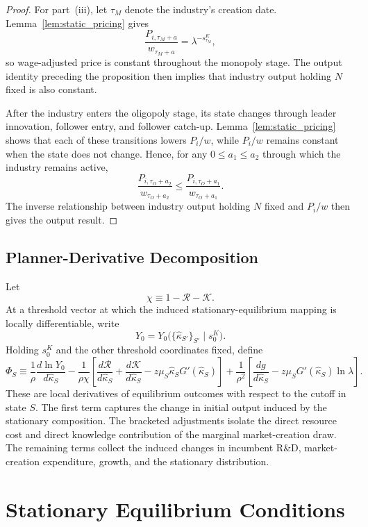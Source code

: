 \documentclass[12pt]{article}
\begin{document}
\begin{proof}
For part~(iii), let \(\tau_M\) denote the industry's creation date.
Lemma~\ref{lem:static_pricing} gives
\[
\frac{P_{i,\tau_M+a}}{w_{\tau_M+a}}
=
\lambda^{-s^K_{\tau_M}},
\]
so wage-adjusted price is constant throughout the monopoly stage. The output
identity preceding the proposition then implies that industry output holding
\(N\) fixed is also constant.

After the industry enters the oligopoly stage, its state changes through
leader innovation, follower entry, and follower catch-up.
Lemma~\ref{lem:static_pricing} shows that each of these transitions lowers
\(P_i/w\), while \(P_i/w\) remains constant when the state does not change.
Hence, for any \(0\leq a_1\leq a_2\) through which the industry remains active,
\[
\frac{P_{i,\tau_O+a_2}}{w_{\tau_O+a_2}}
\leq
\frac{P_{i,\tau_O+a_1}}{w_{\tau_O+a_1}}.
\]
The inverse relationship between industry output holding \(N\) fixed and
\(P_i/w\) then gives the output result.
\end{proof}

\subsection{Planner-Derivative Decomposition}\label{app:planner_derivative}

Let
\[
\chi\equiv1-\mathcal{R}-\mathcal{K}.
\]
At a threshold vector at which the induced stationary-equilibrium mapping is locally differentiable, write
\[
Y_0
=
Y_0\bigl(\{\hat\kappa_{S'}\}_{S'}\mid s^K_0\bigr).
\]
Holding \(s^K_0\) and the other threshold coordinates fixed, define
\[
\Phi_S\equiv\frac{1}{\rho}\frac{d\ln Y_0}{d\hat\kappa_S}
-\frac{1}{\rho\chi}\left[\frac{d\mathcal{R}}{d\hat\kappa_S}+\frac{d\mathcal{K}}{d\hat\kappa_S}-z\mu_S\hat\kappa_SG'(\hat\kappa_S)\right]
+\frac{1}{\rho^2}\left[\frac{dg}{d\hat\kappa_S}-z\mu_SG'(\hat\kappa_S)\ln\lambda\right].\]
These are local derivatives of equilibrium outcomes with respect to the cutoff in state \(S\). The first term captures the change in initial output induced by the stationary composition. The bracketed adjustments isolate the direct resource cost and direct knowledge contribution of the marginal market-creation draw. The remaining terms collect the induced changes in incumbent R\&D, market-creation expenditure, growth, and the stationary distribution.

\section{Stationary Equilibrium Conditions}\label{app:eqm_conditions}
\end{document}
